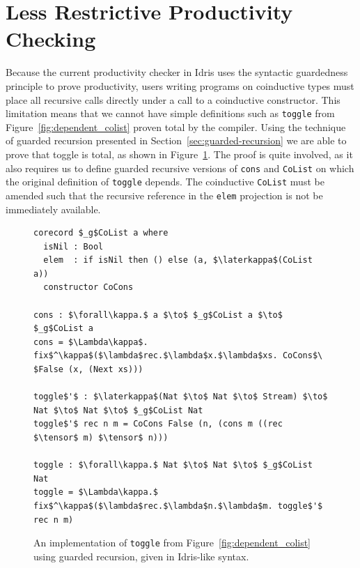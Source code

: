 \section{Less Restrictive Productivity Checking} 
\label{sec:less-restr-prod}


Because the current productivity checker in Idris uses the syntactic
guardedness principle to prove productivity, users writing programs on
coinductive types must place all recursive calls directly under a call to a
coinductive constructor. This limitation means that we cannot have simple
definitions such as \texttt{toggle} from Figure~\ref{fig:dependent_colist}
proven total by the compiler. Using the technique of guarded recursion presented
in Section~\ref{sec:guarded-recursion} we are able to prove that toggle is
total, as shown in Figure~\ref{fig:toggle_guarded_recursion}. The proof is quite
involved, as it also requires us to define guarded recursive versions of
\texttt{cons} and \texttt{CoList} on which the original definition of
\texttt{toggle} depends. The coinductive \texttt{CoList} must be amended such
that the recursive reference in the \texttt{elem} projection is not be
immediately available.

\begin{figure}[h]
\begin{lstlisting}[mathescape]
corecord $_g$CoList a where
  isNil : Bool
  elem  : if isNil then () else (a, $\laterkappa$(CoList a))
  constructor CoCons

cons : $\forall\kappa.$ a $\to$ $_g$CoList a $\to$ $_g$CoList a
cons = $\Lambda\kappa$. fix$^\kappa$($\lambda$rec.$\lambda$x.$\lambda$xs. CoCons$\ $False (x, (Next xs)))

toggle$'$ : $\laterkappa$(Nat $\to$ Nat $\to$ Stream) $\to$ Nat $\to$ Nat $\to$ $_g$CoList Nat
toggle$'$ rec n m = CoCons False (n, (cons m ((rec $\tensor$ m) $\tensor$ n))) 

toggle : $\forall\kappa.$ Nat $\to$ Nat $\to$ $_g$CoList Nat
toggle = $\Lambda\kappa.$ fix$^\kappa$($\lambda$rec.$\lambda$n.$\lambda$m. toggle$'$ rec n m)
\end{lstlisting}
  \caption{An implementation of \texttt{toggle} from
    Figure~\ref{fig:dependent_colist} using guarded recursion, given in
    Idris-like syntax.}
\label{fig:toggle_guarded_recursion}
\end{figure}

